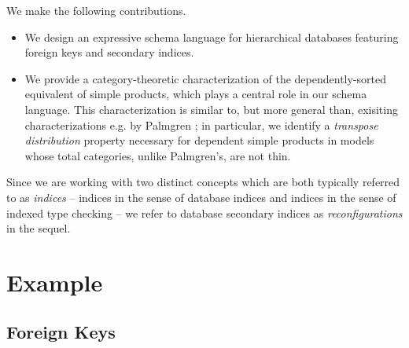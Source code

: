 \documentclass[sigplan,10pt,review,anonymous]{acmart}
\begin{document}
We make the following contributions.
\begin{itemize}   
\item We design an expressive schema language for hierarchical databases featuring foreign keys and secondary indices. 
\item We provide a category-theoretic characterization of the dependently-sorted equivalent of simple products, which plays a central role in our schema language. This characterization is similar to, but more general than, exisiting characterizations e.g. by Palmgren \cite{palmgren2019categories}; in particular, we identify a \emph{transpose distribution} property necessary for dependent simple products in models whose total categories, unlike Palmgren's, are not thin.

\end{itemize}

Since we are working with two distinct concepts which are both typically referred to as \emph{indices} -- indices in the sense of database indices and indices in the sense of indexed type checking -- we refer to database secondary indices as \emph{reconfigurations} in the sequel.





\section{Example}




\subsection{Foreign Keys}
\end{document}
